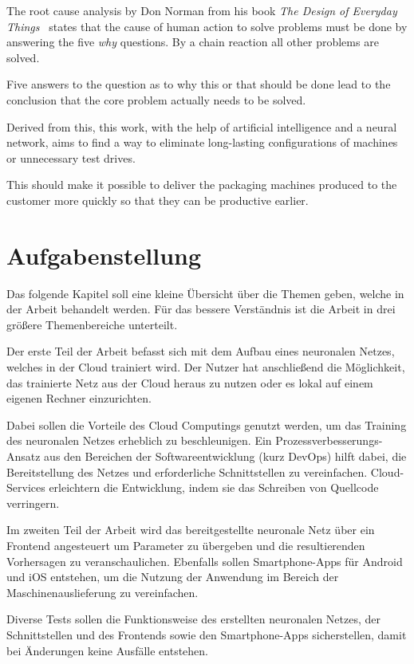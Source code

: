 The root cause analysis by Don Norman from his book \textit{The Design of Everyday
Things}~\cite{book_einleitung_donnorman} states that the cause of human action to solve problems must be done by
answering the five \textit{why} questions. By a chain reaction all other problems are solved.

Five answers to the question as to why this or that should be done lead to the conclusion that the core problem actually
needs to be solved.

Derived from this, this work, with the help of artificial intelligence and a neural network, aims to find a way to
eliminate long-lasting configurations of machines or unnecessary test drives.

This should make it possible to deliver the packaging machines produced to the customer more quickly so that they can be
productive earlier.

\newpage

\section{Aufgabenstellung}
\label{sec:aufgabenstellung}
Das folgende Kapitel soll eine kleine Übersicht über die Themen geben, welche in der Arbeit behandelt werden. Für das
bessere Verständnis ist die Arbeit in drei größere Themenbereiche unterteilt.

Der erste Teil der Arbeit befasst sich mit dem Aufbau eines neuronalen Netzes, welches in der Cloud trainiert wird. Der
Nutzer hat anschließend die Möglichkeit, das trainierte Netz aus der Cloud heraus zu nutzen oder es lokal auf einem
eigenen Rechner einzurichten.

Dabei sollen die Vorteile des Cloud Computings genutzt werden, um das Training des neuronalen Netzes erheblich zu
beschleunigen. Ein Prozessverbesserungs-Ansatz aus den Bereichen der Softwareentwicklung (kurz DevOps) hilft dabei, die
Bereitstellung des Netzes und erforderliche Schnittstellen zu vereinfachen. Cloud-Services erleichtern die Entwicklung,
indem sie das Schreiben von Quellcode verringern.

Im zweiten Teil der Arbeit wird das bereitgestellte neuronale Netz über ein Frontend angesteuert um Parameter  zu
übergeben und die resultierenden Vorhersagen zu veranschaulichen. Ebenfalls sollen Smartphone-Apps für Android und iOS
entstehen, um die Nutzung der Anwendung im Bereich der Maschinenauslieferung zu vereinfachen.

Diverse Tests sollen die Funktionsweise des erstellten neuronalen Netzes, der Schnittstellen und des Frontends
sowie den Smartphone-Apps sicherstellen, damit bei Änderungen keine Ausfälle entstehen.


